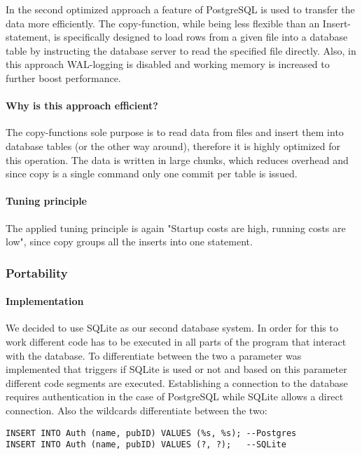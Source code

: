 \documentclass[11pt]{scrartcl}
\begin{document}
In the second optimized approach a feature of PostgreSQL is used to transfer the data more efficiently. The copy-function, while being less flexible than an Insert-statement, is specifically designed to load rows from a given file into a database table by instructing the database server to read the specified file directly. Also, in this approach WAL-logging is disabled and working memory is increased to further boost performance.

\paragraph{Why is this approach efficient?}

The copy-functions sole purpose is to read data from files and insert them into database tables (or the other way around), therefore it is highly optimized for this operation. The data is written in large chunks, which reduces overhead and since copy is a single command only one commit per table is issued. 

\paragraph{Tuning principle}

The applied tuning principle is again "Startup costs are high, running costs are low", since copy groups all the inserts into one statement.

\subsubsection*{Portability}

\paragraph{Implementation}

We decided to use SQLite as our second database system. In order for this to work different code has to be executed in all parts of the program that interact with the database. To differentiate between the two a parameter was implemented that triggers if SQLite is used or not and based on this parameter different code segments are executed. Establishing a connection to the database requires authentication in the case of PostgreSQL while SQLite allows a direct connection. Also the wildcards differentiate between the two:

\begin{lstlisting}[style=dbtsql]
INSERT INTO Auth (name, pubID) VALUES (%s, %s);	--Postgres
INSERT INTO Auth (name, pubID) VALUES (?, ?);	--SQLite
\end{lstlisting}
\end{document}
